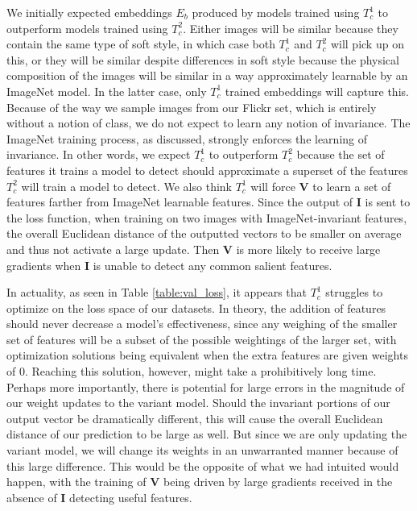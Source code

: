We initially expected embeddings $E_b$ produced by models trained using $T_c^1$ to outperform models trained using $T_c^2$. Either images will be similar because they contain the same type of soft style, in which case both $T_c^1$ and $T_c^2$ will pick up on this, or they will be similar despite differences in soft style because the physical composition of the images will be similar in a way approximately learnable by an ImageNet model. In the latter case, only $T_c^1$ trained embeddings will capture this. Because of the way we sample images from our Flickr set, which is entirely without a notion of class, we do not expect to learn any notion of invariance. The ImageNet training process, as discussed, strongly enforces the learning of invariance. In other words, we expect $T_c^1$ to outperform $T_c^2$ because the set of features it trains a model to detect should approximate a superset of the features $T_c^2$ will train a model to detect. We also think $T_c^1$ will force $\mathbf{V}$ to learn a set of features farther from ImageNet learnable features. Since the output of $\mathbf{I}$ is sent to the loss function, when training on two images with ImageNet-invariant features, the overall Euclidean distance of the outputted vectors to be smaller on average and thus not activate a large update. Then $\mathbf{V}$ is more likely to receive large gradients when $\mathbf{I}$ is unable to detect any common salient features.

In actuality, as seen in Table \ref{table:val_loss}, it appears that $T_c^1$ struggles to optimize on the loss space of our datasets. In theory, the addition of features should never decrease a model's effectiveness, since any weighing of the smaller set of features will be a subset of the possible weightings of the larger set, with optimization solutions being equivalent when the extra features are given weights of 0. Reaching this solution, however, might take a prohibitively long time. Perhaps more importantly, there is potential for large errors in the magnitude of our weight updates to the variant model. Should the invariant portions of our output vector be dramatically different, this will cause the overall Euclidean distance of our prediction to be large as well. But since we are only updating the variant model, we will change its weights in an unwarranted manner because of this large difference. This would be the opposite of what we had intuited would happen, with the training of $\mathbf{V}$ being driven by large gradients received in the absence of $\mathbf{I}$ detecting useful features.

